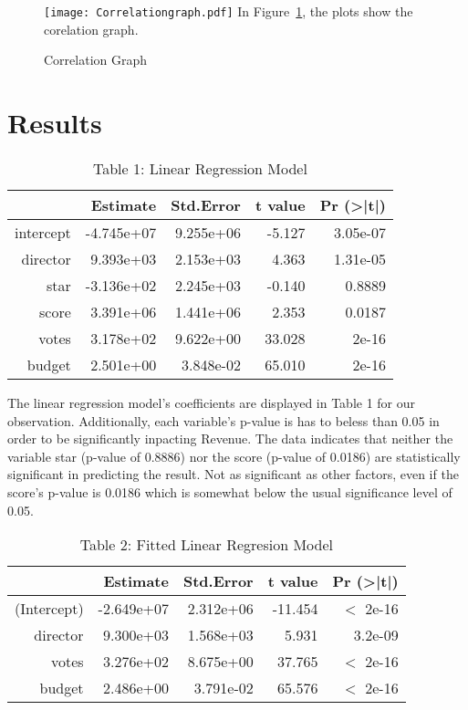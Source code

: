 \documentclass[12pt]{article}
\begin{document}
\begin{figure}
  \centering
	\caption{Correlation Graph}
	\texttt{[image: Correlationgraph.pdf]}
	\label{fig:Correlationgraph}
In Figure~\ref{fig:Correlationgraph}, the plots show the corelation graph.
\end{figure}

\section{Results}
\label{sec:res}

\begin{table}[h]
\caption{Table 1: Linear Regression Model}
\centering
\begin{tabular}{rrrrr}
\hline
 & Estimate   & Std.Error & t value & Pr (\textgreater|t|) \\
 \hline
intercept & -4.745e+07 & 9.255e+06 & -5.127  & 3.05e-07 \\ 
director  & 9.393e+03  & 2.153e+03 & 4.363   & 1.31e-05 \\ 
star      & -3.136e+02 & 2.245e+03 & -0.140  & 0.8889 \\ 
score     & 3.391e+06  & 1.441e+06 & 2.353   & 0.0187 \\ 
votes     & 3.178e+02  & 9.622e+00 & 33.028  & 2e-16 \\ 
budget    & 2.501e+00  & 3.848e-02 & 65.010  & 2e-16 \\
\hline
\end{tabular}
\end{table}

The linear regression model's coefficients are displayed in Table 1 for our observation. 
Additionally, each variable's p-value is has to beless than 0.05 in order to be significantly
inpacting Revenue. The data indicates that neither the variable star (p-value of 0.8886) 
nor the score (p-value of 0.0186) are statistically significant in predicting the result.
Not as significant as other factors, even if the score's p-value is 0.0186 which is somewhat
below the usual significance level of 0.05.

\begin{table}[h]
\caption{Table 2: Fitted Linear Regresion Model}
\centering
\begin{tabular}{rrrrr}
\hline
 & Estimate   & Std.Error & t value & Pr (\textgreater|t|) \\ 
\hline
(Intercept) & -2.649e+07 & 2.312e+06 & -11.454 & $<$ 2e-16 \\
director    & 9.300e+03  & 1.568e+03 & 5.931   & 3.2e-09 \\
votes       & 3.276e+02  & 8.675e+00 & 37.765  & $<$ 2e-16 \\
budget      & 2.486e+00  & 3.791e-02 & 65.576  & $<$ 2e-16 \\
\hline
\end{tabular}
\end{table}
\end{document}
